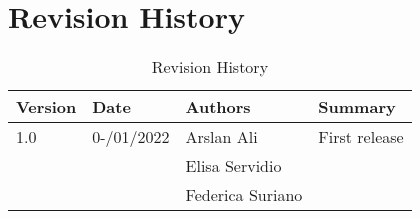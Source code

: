 \section{Revision History}
\begin{center}
\setlength\tabcolsep{7pt}
\renewcommand{\arraystretch}{1.5}
\begin{longtable}{|p{1.5cm}|p{1.6cm}|p{2.75cm}|p{2cm}|}
\caption{Revision History}\\
\hline
\endfirsthead
\endhead
\hline
\endlastfoot
\rowcolor{green2}
\textbf{Version} & \textbf{Date} & \textbf{Authors} & \textbf{Summary}\\
\hline
1.0 & 0-/01/2022 & Arslan Ali &  First release\\
& & Elisa Servidio & \\
& & Federica Suriano &\\
\end{longtable}
\end{center}
